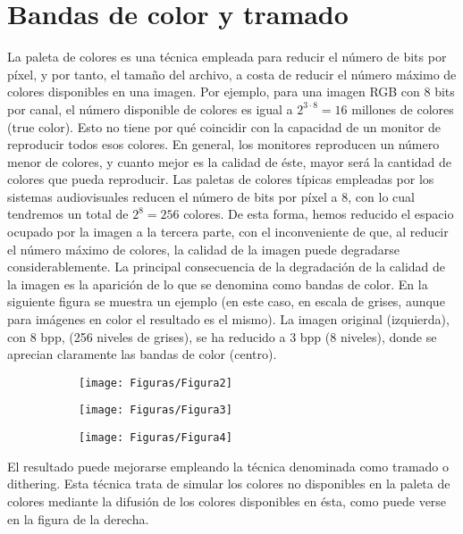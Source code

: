\documentclass[es,practica]{uah}
\begin{document}
\section{Bandas de color y tramado}

La paleta de colores es una técnica empleada para reducir el número de bits por píxel, y por tanto, el tamaño del archivo, a costa de reducir el número máximo de colores disponibles en una imagen. Por ejemplo, para una imagen RGB con 8 bits por canal, el número disponible de colores es igual a $2^{3\cdot 8}=16$ millones de colores (true color). Esto no tiene por qué coincidir con la capacidad de un monitor de reproducir todos esos colores. En general, los monitores reproducen un número menor de colores, y cuanto mejor es la calidad de éste, mayor será la cantidad de colores que pueda reproducir.
Las paletas de colores típicas empleadas por los sistemas audiovisuales reducen el número de bits por píxel a 8, con lo cual tendremos un total de $2^8=256$ colores. De esta forma, hemos reducido el espacio ocupado por la imagen a la tercera parte, con el inconveniente de que, al reducir el número máximo de colores, la calidad de la imagen puede degradarse considerablemente.
La principal consecuencia de la degradación de la calidad de la imagen es la aparición de lo que se denomina como bandas de color. En la siguiente figura se muestra un ejemplo (en este caso, en escala de grises, aunque para imágenes en color el resultado es el mismo). La imagen original (izquierda), con 8 bpp, (256 niveles de grises), se ha reducido a 3 bpp (8 niveles), donde se aprecian claramente las bandas de color (centro).

\begin{figure}[h!]
\centering
\begin{subfigure}
  \centering
  \texttt{[image: Figuras/Figura2]}
\end{subfigure}
\begin{subfigure}
  \centering
  \texttt{[image: Figuras/Figura3]}
\end{subfigure}
\begin{subfigure}
  \centering
  \texttt{[image: Figuras/Figura4]}
\end{subfigure}
\end{figure}


El resultado puede mejorarse empleando la técnica denominada como tramado o dithering. Esta técnica trata de simular los colores no disponibles en la paleta de colores mediante la difusión de los colores disponibles en ésta, como puede verse en la figura de la derecha.
\end{document}
